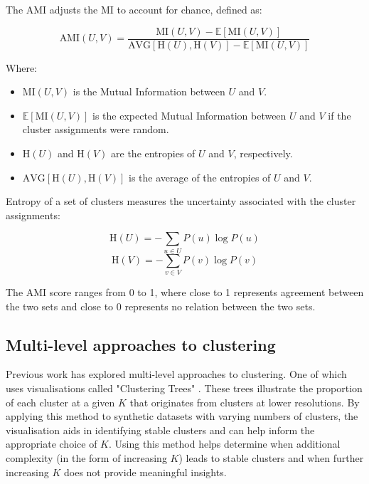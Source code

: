 The AMI adjusts the MI to account for chance, defined as:

\begin{equation}
\label{eq:AMI}
\text{AMI}(U, V) = \frac{\text{MI}(U, V) - \mathbb{E}[\text{MI}(U, V)]}{\text{AVG}[\text{H}(U), \text{H}(V)] - \mathbb{E}[\text{MI}(U, V)]}
\end{equation}

Where:
\begin{itemize}
    \item \( \text{MI}(U, V) \) is the Mutual Information between \( U \) and \( V \).
    \item \( \mathbb{E}[\text{MI}(U, V)] \) is the expected Mutual Information between \( U \) and \( V \) if the cluster assignments were random.
    \item \( \text{H}(U) \) and \( \text{H}(V) \) are the entropies of \( U \) and \( V \), respectively.
    \item \( \text{AVG}[\text{H}(U), \text{H}(V)] \) is the average of the entropies of \( U \) and \( V \).
\end{itemize}

Entropy of a set of clusters measures the uncertainty associated with the cluster assignments:

\[
\text{H}(U) = -\sum_{u \in U} P(u) \log P(u)
\]
\[
\text{H}(V) = -\sum_{v \in V} P(v) \log P(v)
\]



The AMI score ranges from 0 to 1, where close to 1 represents agreement between the two sets and close to 0 represents no relation between the two sets.


\subsection*{Multi-level approaches to clustering}
Previous work has explored multi-level approaches to clustering. One of which uses visualisations called "Clustering Trees" \cite{zappiaClusteringTreesVisualization2018c}. These trees illustrate the proportion of each cluster at a given $K$ that originates from clusters at lower resolutions. By applying this method to synthetic datasets with varying numbers of clusters, the visualisation aids in identifying stable clusters and can help inform the appropriate choice of $K$. Using this method helps determine when additional complexity (in the form of increasing $K$) leads to stable clusters and when further increasing $K$ does not provide meaningful insights.

